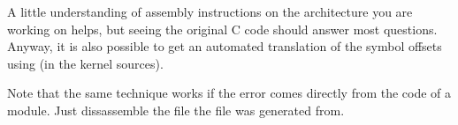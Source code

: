 A little understanding of assembly instructions on the architecture
you are working on helps, but seeing the original C code should answer
most questions. Anyway, it is also possible to get an automated
translation of the symbol offsets using
 (in the kernel sources).

Note that the same technique works if the error comes directly from
the code of a module. Just dissassemble the  file
the  file was generated from.
